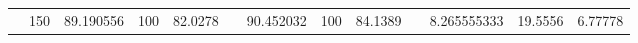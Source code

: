 \begin{table*}[]
{\begin{tabular}{lrrrrlrrrlrrr}
                     & 150                       & 89.190556                                                                       & 100                                                                             & 82.0278                                                                         &           & 90.452032                                                                       & 100                                                                             & 84.1389                                                                         &           & 8.265555333                                                                     & 19.5556                                                                         & 6.77778                                                   \end{tabular}}
\label{tab:tbl_rst}
\end{table*}
